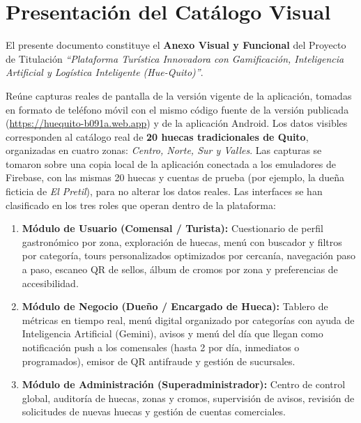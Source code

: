 \newpage
\section*{Presentación del Catálogo Visual}

El presente documento constituye el \textbf{Anexo Visual y Funcional} del Proyecto de Titulación \textit{``Plataforma Turística Innovadora con Gamificación, Inteligencia Artificial y Logística Inteligente (Hue-Quito)''}.

Reúne capturas reales de pantalla de la versión vigente de la aplicación, tomadas en formato de teléfono móvil con el mismo código fuente de la versión publicada (\url{https://huequito-b091a.web.app}) y de la aplicación Android. Los datos visibles corresponden al catálogo real de \textbf{20 huecas tradicionales de Quito}, organizadas en cuatro zonas: \textit{Centro, Norte, Sur y Valles}. Las capturas se tomaron sobre una copia local de la aplicación conectada a los emuladores de Firebase, con las mismas 20 huecas y cuentas de prueba (por ejemplo, la dueña ficticia de \textit{El Pretil}), para no alterar los datos reales. Las interfaces se han clasificado en los tres roles que operan dentro de la plataforma:

\begin{enumerate}[label=\textbf{\Roman*.}]
  \item \textbf{Módulo de Usuario (Comensal / Turista):} Cuestionario de perfil gastronómico por zona, exploración de huecas, menú con buscador y filtros por categoría, tours personalizados optimizados por cercanía, navegación paso a paso, escaneo QR de sellos, álbum de cromos por zona y preferencias de accesibilidad.
  \item \textbf{Módulo de Negocio (Dueño / Encargado de Hueca):} Tablero de métricas en tiempo real, menú digital organizado por categorías con ayuda de Inteligencia Artificial (Gemini), avisos y menú del día que llegan como notificación push a los comensales (hasta 2 por día, inmediatos o programados), emisor de QR antifraude y gestión de sucursales.
  \item \textbf{Módulo de Administración (Superadministrador):} Centro de control global, auditoría de huecas, zonas y cromos, supervisión de avisos, revisión de solicitudes de nuevas huecas y gestión de cuentas comerciales.
\end{enumerate}

